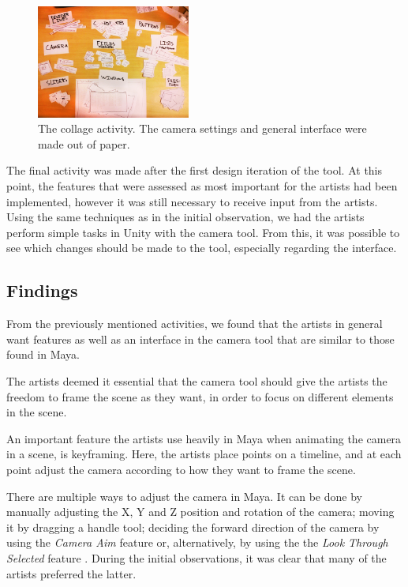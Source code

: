 \begin{figure}[htbp]
\centering
\includegraphics[width=0.45\textwidth]{Pics/labels}
\caption{The collage activity. The camera settings and general interface were made out of paper.}
\label{fig:collage}
\end{figure}

The final activity was made after the first design iteration of the tool. At this point, the features that were assessed as most important for the artists had been implemented, however it was still necessary to receive input from the artists. Using the same techniques as in the initial observation, we had the artists perform simple tasks in Unity with the camera tool. From this, it was possible to see which changes should be made to the tool, especially regarding the interface.

\subsection{Findings}
From the previously mentioned activities, we found that the artists in general want features as well as an interface in the camera tool that are similar to those found in Maya.

The artists deemed it essential that the camera tool should give the artists the freedom to frame the scene as they want, in order to focus on different elements in the scene.

An important feature the artists use heavily in Maya when animating the camera in a scene, is keyframing. Here, the artists place points on a timeline, and at each point adjust the camera according to how they want to frame the scene.

There are multiple ways to adjust the camera in Maya. It can be done by manually adjusting the X, Y and Z position and rotation of the camera; moving it by dragging a handle tool; deciding the forward direction of the camera by using the \textit{Camera Aim} feature \cite{maya_camAim} or, alternatively, by using the the \textit{Look Through Selected} feature \cite{maya_lookThrough}. During the initial observations, it was clear that many of the artists preferred the latter.

